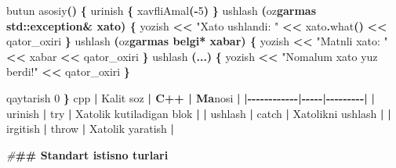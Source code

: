 \documentclass[a4paper,11pt,twoside,openright]{book}
\newenvironment{Shaded}{\begin{snugshade}}{\end{snugshade}}
\newcommand{\CharTok}[1]{\textcolor[rgb]{0.31,0.60,0.02}{#1}}
\newcommand{\DecValTok}[1]{\textcolor[rgb]{0.00,0.00,0.81}{#1}}
\newcommand{\ErrorTok}[1]{\textcolor[rgb]{0.64,0.00,0.00}{\textbf{#1}}}
\newcommand{\NormalTok}[1]{#1}
\newcommand{\OperatorTok}[1]{\textcolor[rgb]{0.81,0.36,0.00}{\textbf{#1}}}
\newcommand{\PreprocessorTok}[1]{\textcolor[rgb]{0.56,0.35,0.01}{\textit{#1}}}
\newcommand{\StringTok}[1]{\textcolor[rgb]{0.31,0.60,0.02}{#1}}
\begin{document}
\begin{Shaded}
\begin{Highlighting}[]
\NormalTok{butun asosiy}\OperatorTok{()} \OperatorTok{\{}
\NormalTok{    urinish }\OperatorTok{\{}
\NormalTok{        xavfliAmal}\OperatorTok{({-}}\DecValTok{5}\OperatorTok{)}
    \OperatorTok{\}}\NormalTok{ ushlash }\OperatorTok{(}\NormalTok{o}\CharTok{\textquotesingle{}z}\ErrorTok{garmas std::exception\& xato) \{}
\NormalTok{        yozish }\OperatorTok{\textless{}\textless{}} \StringTok{"Xato ushlandi: "} \OperatorTok{\textless{}\textless{}}\NormalTok{ xato}\OperatorTok{.}\NormalTok{what}\OperatorTok{()} \OperatorTok{\textless{}\textless{}}\NormalTok{ qator\_oxiri}
    \OperatorTok{\}}\NormalTok{ ushlash }\OperatorTok{(}\NormalTok{o}\CharTok{\textquotesingle{}z}\ErrorTok{garmas belgi* xabar) \{}
\NormalTok{        yozish }\OperatorTok{\textless{}\textless{}} \StringTok{"Matnli xato: "} \OperatorTok{\textless{}\textless{}}\NormalTok{ xabar }\OperatorTok{\textless{}\textless{}}\NormalTok{ qator\_oxiri}
    \OperatorTok{\}}\NormalTok{ ushlash }\OperatorTok{(...)} \OperatorTok{\{}
\NormalTok{        yozish }\OperatorTok{\textless{}\textless{}} \StringTok{"Noma\textquotesingle{}lum xato yuz berdi!"} \OperatorTok{\textless{}\textless{}}\NormalTok{ qator\_oxiri}
    \OperatorTok{\}}

\NormalTok{    qaytarish }\DecValTok{0}
\OperatorTok{\}}
\ErrorTok{\textasciigrave{}\textasciigrave{}\textasciigrave{}}\NormalTok{cpp}
\OperatorTok{|}\NormalTok{ Kalit so}\CharTok{\textquotesingle{}z}\ErrorTok{ | C++ | Ma}\CharTok{\textquotesingle{}}\NormalTok{nosi }\OperatorTok{|}
\OperatorTok{|{-}{-}{-}{-}{-}{-}{-}{-}{-}{-}{-}{-}|{-}{-}{-}{-}{-}|{-}{-}{-}{-}{-}{-}{-}{-}{-}|}
\OperatorTok{|} \ErrorTok{\textasciigrave{}}\NormalTok{urinish}\ErrorTok{\textasciigrave{}} \OperatorTok{|} \ErrorTok{\textasciigrave{}}\NormalTok{try}\ErrorTok{\textasciigrave{}} \OperatorTok{|}\NormalTok{ Xatolik kutiladigan blok }\OperatorTok{|}
\OperatorTok{|} \ErrorTok{\textasciigrave{}}\NormalTok{ushlash}\ErrorTok{\textasciigrave{}} \OperatorTok{|} \ErrorTok{\textasciigrave{}}\NormalTok{catch}\ErrorTok{\textasciigrave{}} \OperatorTok{|}\NormalTok{ Xatolikni ushlash }\OperatorTok{|}
\OperatorTok{|} \ErrorTok{\textasciigrave{}}\NormalTok{irgitish}\ErrorTok{\textasciigrave{}} \OperatorTok{|} \ErrorTok{\textasciigrave{}}\NormalTok{throw}\ErrorTok{\textasciigrave{}} \OperatorTok{|}\NormalTok{ Xatolik yaratish }\OperatorTok{|}

\PreprocessorTok{\#}\ErrorTok{\#\# Standart istisno turlari}


\end{Highlighting}
\end{Shaded}
\end{document}
